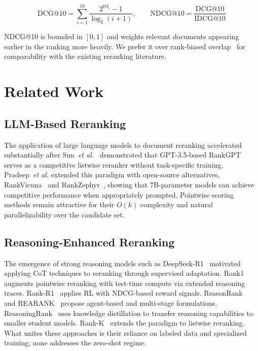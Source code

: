 \documentclass[12pt]{article}
\makeatletter
\newcommand{\ndcg}{NDCG@10}
\newcommand{\CoT}{CoT}
\newcommand{\etal}{\textit{et al.}}
\makeatother
\begin{document}
\begin{equation}
  \mathrm{DCG}@10 = \sum_{i=1}^{10}
    \frac{2^{\mathrm{rel}_i} - 1}{\log_2(i+1)}, \qquad
  \mathrm{NDCG}@10 = \frac{\mathrm{DCG}@10}{\mathrm{IDCG}@10}
\end{equation}

\noindent
\ndcg{} is bounded in $[0,1]$ and weights relevant documents appearing earlier
in the ranking more heavily.  We prefer it over rank-biased
overlap~\citep{webber2010similarity} for comparability with the existing
reranking literature.

\section{Related Work}
\label{sec:related}

\subsection{LLM-Based Reranking}

The application of large language models to document reranking accelerated
substantially after Sun~\etal~\citep{sun2023chatgpt} demonstrated that
GPT-3.5-based RankGPT serves as a competitive listwise reranker without
task-specific training.  Pradeep~\etal{} extended this paradigm with
open-source alternatives, RankVicuna~\citep{pradeep2023rankvicuna} and
RankZephyr~\citep{pradeep2023rankzephyr}, showing that 7B-parameter models
can achieve competitive performance when appropriately prompted.  Pointwise
scoring methods remain attractive for their $O(k)$ complexity and natural
parallelizability over the candidate set.

\subsection{Reasoning-Enhanced Reranking}

The emergence of strong reasoning models such as
DeepSeek-R1~\citep{guo2025deepseekr1} motivated applying \CoT{} techniques
to reranking through supervised adaptation.
Rank1~\citep{weller2025rank1} augments pointwise reranking with test-time
compute via extended reasoning traces.  Rank-R1~\citep{zhuang2025rankr1}
applies RL with NDCG-based reward signals.
ReasonRank~\citep{liu2025reasonrank} and REARANK~\citep{zhang2025rearank}
propose agent-based and multi-stage formulations.
ReasoningRank~\citep{ji2024reasoningrank} uses knowledge distillation to
transfer reasoning capabilities to smaller student models.
Rank-K~\citep{yang2025rankk} extends the paradigm to listwise reranking.
What unites these approaches is their reliance on labeled data and specialized
training; none addresses the zero-shot regime.
\end{document}
